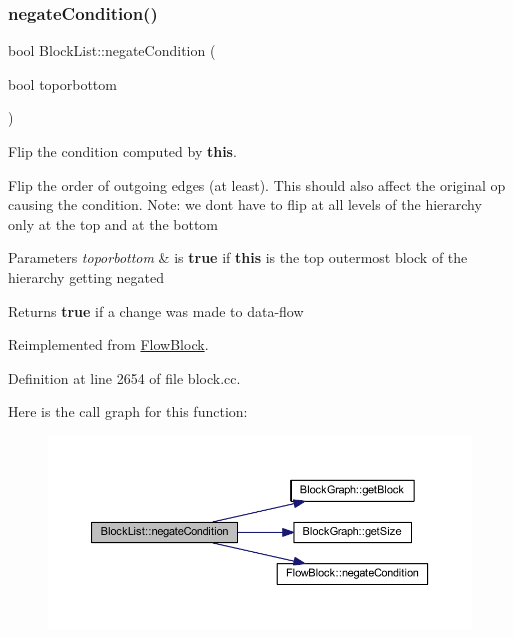 \subsubsection{\texorpdfstring{negateCondition()}{negateCondition()}}
{\footnotesize\ttfamily bool Block\+List\+::negate\+Condition (\begin{DoxyParamCaption}\item[{bool}]{toporbottom }\end{DoxyParamCaption})\hspace{0.3cm}{\ttfamily [virtual]}}



Flip the condition computed by {\bfseries{this}}. 

Flip the order of outgoing edges (at least). This should also affect the original op causing the condition. Note\+: we don\textquotesingle{}t have to flip at all levels of the hierarchy only at the top and at the bottom 
\begin{DoxyParams}{Parameters}
{\em toporbottom} & is {\bfseries{true}} if {\bfseries{this}} is the top outermost block of the hierarchy getting negated \\
\hline
\end{DoxyParams}
\begin{DoxyReturn}{Returns}
{\bfseries{true}} if a change was made to data-\/flow 
\end{DoxyReturn}


Reimplemented from \mbox{\hyperlink{class_flow_block_ae0f8a479ae1548280ff0b4f45bc08dc3}{Flow\+Block}}.



Definition at line 2654 of file block.\+cc.

Here is the call graph for this function\+:
\nopagebreak
\begin{figure}[H]
\begin{center}
\leavevmode
\includegraphics[width=350pt]{class_block_list_a97202688e117da20c82ef225318536ca_cgraph}
\end{center}
\end{figure}
\mbox{\label{class_block_list_ac49227f39d0238f4d86c76a170cc009b}} 
